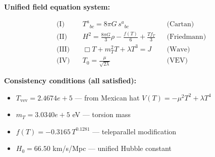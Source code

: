 
\textbf{Unified field equation system:}

\begin{align}
  \text{(I)} \quad & T^a{}_{bc} = 8\pi G \, s^a{}_{bc} && \text{(Cartan)} \\
  \text{(II)} \quad & H^2 = \frac{8\pi G}{3}\rho - \frac{f(T)}{6} + \frac{Tf_T}{3} && \text{(Friedmann)} \\
  \text{(III)} \quad & \Box T + m_T^2 T + \lambda T^3 = J && \text{(Wave)} \\
  \text{(IV)} \quad & T_0 = \frac{\mu}{\sqrt{2\lambda}} && \text{(VEV)}
\end{align}

\textbf{Consistency conditions (all satisfied):}
\begin{itemize}
  \item $T_{\text{vev}} = 2.4674e+5$ — from Mexican hat $V(T) = -\mu^2 T^2 + \lambda T^4$
  \item $m_T = 3.0340e+5$ eV — torsion mass
  \item $f(T) = -0.3165 \, T^{0.1281}$ — teleparallel modification
  \item $H_0 = 66.50$ km/s/Mpc — unified Hubble constant
\end{itemize}